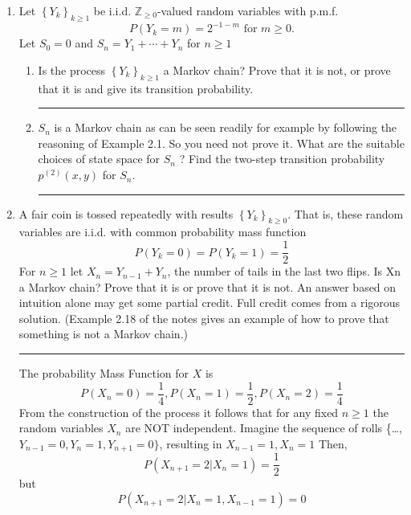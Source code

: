 \documentclass{article} %
\theoremstyle{plain}
\theoremstyle{case}
\begin{document}
\begin{enumerate}[label={\fbox{\textbf{Exercise \#\arabic* :}}}]
  \newpage
  \item Let $\left\{Y_k\right\}_{k \geq 1}$ be i.i.d. $\mathbb{Z}_{\geq 0}$-valued random variables with p.m.f.
    \[
      P\left(Y_k=m\right)=2^{-1-m} \text { for } m \geq 0 .
      \]
    Let $S_0=0$ and $S_n=Y_1+\cdots+Y_n$ for $n \geq 1$
    \begin{enumerate}
      \item Is the process $\left\{Y_k\right\}_{k \geq 1}$ a Markov chain? Prove that it is not, or prove that it is and give its transition probability.
\par\noindent\rule{\textwidth}{0.1pt}
      \item  $S_n$ is a Markov chain as can be seen readily for example by following the reasoning of Example 2.1. So you need not prove it. What are the suitable choices of state space for $S_n$ ? Find the two-step transition probability $p^{(2)}(x, y)$ for $S_n$.
\par\noindent\rule{\textwidth}{0.1pt}
    \end{enumerate} 
  \newpage
  \item A fair coin is tossed repeatedly with results $\left\{Y_k\right\}_{k \geq 0}$. That is, these random variables are i.i.d.  with common
    probability mass function
    \[ P(Y_k=0) = P(Y_k =1) = \frac{1}{2}  \]
    For $n \geq 1$ let $X_n = Y_{n-1} + Y_n$, the number of tails in the
    last two flips. Is Xn a Markov chain?
    Prove that it is or prove that it is not. An answer based on intuition
    alone may get some partial credit. Full credit comes from a rigorous
    solution. (Example 2.18 of the notes gives an example of how to prove
    that something is not a Markov chain.)
\par\noindent\rule{\textwidth}{0.1pt}
    The probability Mass Function for $X$ is 
    \[ P(X_n=0) = \frac{1}{4},  P(X_n=1) = \frac{1}{2},
          P(X_n=2)= \frac{1}{4}    \]
    From the construction of the process it follows that for any
    fixed $n \geq 1$ the random variables $X_n$ are NOT independent.
    Imagine the sequence of rolls
    \{\dots, $Y_{n-1}=0, Y_{n}=1, Y_{n+1}=0\}$, resulting in 
    $X_{n-1}=1, X_{n}=1$
    Then,
    \[ P(X_{n+1} = 2 | X_n = 1) = \frac{1}{2}  \]
    but
    \[ P(X_{n+1} = 2 | X_n = 1, X_{n-1} = 1) = 0  \]
    
\end{enumerate}
\end{document}
